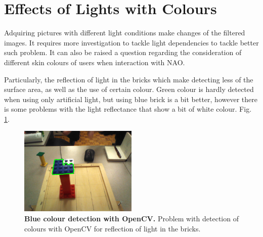 \documentclass[12pt]{article}
\begin{document}
\section{Effects of Lights with Colours}
Adquiring pictures with different light conditions
make changes of the filtered images.
It requires more investigation to tackle light 
dependencies to tackle better such problem.
It can also be raised a question regarding the consideration
of different skin colours of users when interaction with NAO.


Particularly, the reflection of light in the bricks
which make detecting less of the surface area, as well
as the use of certain colour. Green colour is hardly 
detected when using only artificial light, but 
using blue brick is a bit better, however there is 
some problems with the light reflectance that 
show a bit of white colour. Fig. \ref{fig:bbp}.

\begin{figure}[ht]
\centering
\includegraphics[width=0.5\textwidth]{experiment/bricks/bluebrickproblem}
    \caption{
	{\bf Blue colour detection with OpenCV.}
	Problem with detection of colours with OpenCV \cite{opencv_library}
	for reflection of light in the bricks.
        }
\label{fig:bbp}
\end{figure}





\newpage



\end{document}
